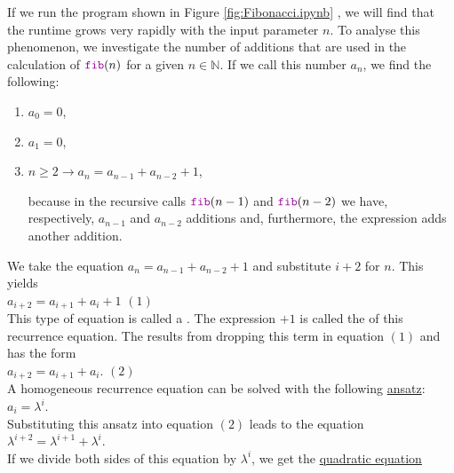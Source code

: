 If we run the program shown in Figure \ref{fig:Fibonacci.ipynb} , we will find that the runtime grows very rapidly with
the input parameter $n$.  To analyse this phenomenon, we investigate the number of additions that are used in the
calculation of $\mytt{fib}(n)$ for a given $n \in \mathbb{N}$.  If we call this number $a_n$, we find
the following:
\begin{enumerate}
\item $a_0 = 0$,
\item $a_1 = 0$,
\item $n \geq 2 \rightarrow a_n = a_{n-1} + a_{n-2} + 1$,

      because in the recursive calls $\mytt{fib}(n-1)$ and $\mytt{fib}(n-2)$ we have, respectively, 
      $a_{n-1}$ and $a_{n-2}$ additions and, furthermore, the expression
       adds another addition.
\end{enumerate}
We take the equation $a_n = a_{n-1} + a_{n-2} + 1$ and substitute $i+2$ for $n$.  This yields
\\[0.2cm]
\hspace*{1.3cm} $a_{i+2} = a_{i+1} + a_i + 1$ \hspace*{\fill} $(1)$
\\[0.2cm]
This type of equation is called a .  The expression $+ 1$ is
called the  of this recurrence equation.
The  
results from dropping this term in equation $(1)$ and has the form
\\[0.2cm]
\hspace*{1.3cm}
$a_{i+2} = a_{i+1} + a_i$. \hspace*{\fill} $(2)$
\\[0.2cm]
A homogeneous recurrence equation can be solved with the following
\href{https://en.oxforddictionaries.com/definition/ansatz}{ansatz}:
\\[0.2cm]
\hspace*{1.3cm} $a_i = \lambda^i$. \\[0.2cm]
Substituting this ansatz into equation $(2)$ leads to the equation 
\\[0.2cm]
\hspace*{1.3cm}
$\lambda^{i+2} = \lambda^{i+1} + \lambda^i$.
\\[0.2cm]
If we divide both sides of this equation by $\lambda^i$, we get the
\href{https://en.wikipedia.org/wiki/Quadratic_equation}{quadratic equation}
